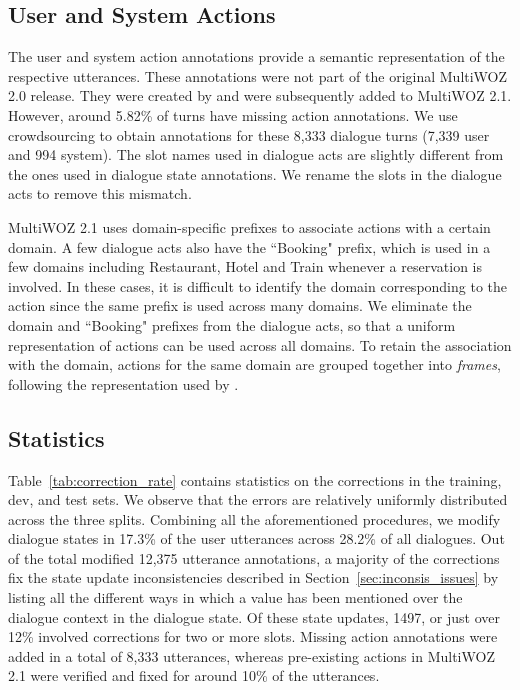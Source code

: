 \subsection{User and System Actions}
The user and system action annotations provide a semantic representation of the respective utterances. These annotations were not part of the original MultiWOZ 2.0 release. They were created by \citet{lee2019convlab} and were subsequently added to MultiWOZ 2.1. However, around 5.82\% of turns have missing action annotations. We use crowdsourcing to obtain annotations for these 8,333 dialogue turns (7,339 user and 994 system). The slot names used in dialogue acts are slightly different from the ones used in dialogue state annotations. We rename the slots in the dialogue acts to remove this mismatch.

MultiWOZ 2.1 uses domain-specific prefixes to associate actions with a certain domain. A few dialogue acts also have the ``Booking" prefix, which is used in a few domains including Restaurant, Hotel and Train whenever a reservation is involved. In these cases, it is difficult to identify the domain corresponding to the action since the same prefix is used across many domains. We eliminate the domain and ``Booking" prefixes from the dialogue acts, so that a uniform representation of actions can be used across all domains. To retain the association with the domain, actions for the same domain are grouped together into \textit{frames}, following the representation used by \citet{rastogi2019scalable}.

\subsection{Statistics}
Table~\ref{tab:correction_rate} contains statistics on the corrections in the training, dev, and test sets. We observe that the errors are relatively uniformly distributed across the three splits. Combining all the aforementioned procedures, we modify dialogue states in 17.3\% of the user utterances across 28.2\% of all dialogues. Out of the total modified 12,375 utterance annotations, a majority of the corrections fix the state update inconsistencies described in Section~\ref{sec:inconsis_issues} by listing all the different ways in which a value has been mentioned over the dialogue context in the dialogue state. Of these state updates, 1497, or just over 12\% involved corrections for two or more slots. Missing action annotations were added in a total of 8,333 utterances, whereas pre-existing actions in MultiWOZ 2.1 were verified and fixed for around 10\% of the utterances.

